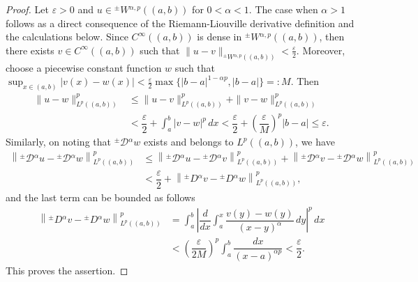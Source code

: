 \documentclass[leqno,final]{siamltex}
\numberwithin{equation}{section}
\newcommand{\eps}{\varepsilon}
\renewcommand{\(}{\bigl(}
\renewcommand{\)}{\bigr)}
\begin{document}
    \begin{proof}
        Let $\eps > 0$ and $u \in {^{\pm}}{W}{^{\alpha,p}}((a,b))$ for $0<\alpha <1$.  The case when $\alpha >1$ follows as a direct consequence of the Riemann-Liouville derivative definition and the calculations below. Since $C^{\infty}((a,b))$ is dense in ${^{\pm}}{W}{^{\alpha,p}}((a,b))$, then there exists $v \in C^{\infty}((a,b))$ such that $\|u-v\|_{{^{\pm}}{W}{^{\alpha,p}}((a,b))} < \frac{\eps}{2}$. Moreover, choose a piecewise constant 
        function $w$ such that $\sup_{x \in (a,b)} |v(x) - w(x)| < \frac{\eps}{2}\max\{|b-a|^{1-\alpha p} , |b-a|\} =:M$.
        Then 
        \begin{align*}
            \|u - w\|_{L^{p}((a,b))}^{p} &\leq \|u-v\|_{L^{p}((a,b))}^{p} + \|v - w\|_{L^{p}((a,b))}^{p} \\ 
            &< \dfrac{\eps}{2} + \int_{a}^{b} |v-w|^{p}\,dx 
            <\dfrac{\eps}{2} + \left( \dfrac{\eps}{M}\right)^{p} |b-a| 
            \leq  \eps .
        \end{align*}
        Similarly,  on noting that ${^{\pm}}{\mathcal{D}}{^{\alpha}}w$ exists and belongs to $L^p((a,b))$, 
        we have
        \begin{align*}
            \left\|{^{\pm}}{\mathcal{D}}{^{\alpha}} u - {^{\pm}}{\mathcal{D}}{^{\alpha}}w \right\|_{L^{p}((a,b))}^{p} &\leq \left\|{^{\pm}}{\mathcal{D}}{^{\alpha}} u - {^{\pm}}{\mathcal{D}}{^{\alpha}}v \right\|_{L^{p}((a,b))}^{p} + \left\|{^{\pm}}{\mathcal{D}}{^{\alpha}} v - {^{\pm}}{\mathcal{D}}{^{\alpha}}w \right\|_{L^{p}((a,b))}^{p}\\
            &< \dfrac{\eps}{2} + \left\|{^{\pm}}{D}{^{\alpha}} v - {^{\pm}}{D}{^{\alpha}}w \right\|_{L^{p}((a,b))}^{p},
        \end{align*}
        and the last term can be bounded as follows 
        \begin{align*}
            \left\|{^{\pm}}{D}{^{\alpha}} v - {^{\pm}}{D}{^{\alpha}}w \right\|_{L^{p}((a,b))}^{p}&= \int_{a}^{b} \left| \dfrac{d}{dx} \int_{a}^{x} \dfrac{v(y) - w(y)}{(x-y)^{\alpha}}\,dy \right|^{p}\,dx\\
            &< \left(\dfrac{\eps}{2 M}\right)^{p} \int_{a}^{b} \dfrac{dx}{(x-a)^{\alpha p}} 
            <\dfrac{\eps}{2}.
        \end{align*}
        This proves the assertion. 
    \end{proof}
\end{document}
